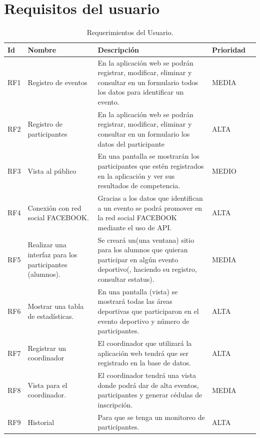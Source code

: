 	\section{Requisitos del usuario}
	\begin{table}[htbp]
		\begin{center}
			\begin{tabular}{|l|p{45mm}|p{45mm}|p{45mm}|l}
				\hline
				Id & Nombre & Descripción & Prioridad \\
				\hline 
				RF1 & Registro de eventos & En la aplicación web se podrán registrar, modificar, eliminar y consultar  en un formulario todos los datos para identificar un evento.
				& MEDIA \\ \hline
				RF2 & Registro de participantes & En la aplicación web se podrán registrar, modificar, eliminar y consultar  en un formulario los datos del participante & ALTA  \\ \hline
				RF3 & Vista al público & En una pantalla se mostrarán los participantes que estén registrados en la aplicación y ver sus resultados de competencia. & MEDIO \\ \hline
				RF4 & Conexión con red social FACEBOOK. & Gracias a los datos que identifican a un evento se podrá promover en la red social FACEBOOK mediante el uso de API.& ALTA \\ \hline
				RF5 & Realizar una interfaz para los participantes (alumnos). &Se creará un(una ventana)  sitio para los alumnos que quieran participar en algún evento deportivo(, haciendo su registro, consultar estatus). & MEDIA \\ \hline
				RF6 & Mostrar una tabla de estadísticas. & En una pantalla (vista)  se mostrará todas las áreas deportivas que participaron en el evento deportivo y  número de participantes. & ALTA \\ \hline
				RF7 & Registrar un coordinador & El coordinador que utilizará la aplicación web tendrá que ser registrado en la base de datos. & ALTA \\ \hline
				RF8 & Vista para el coordinador. &El coordinador tendrá una vista donde podrá dar de alta eventos, participantes y generar cédulas de inscripción. & MEDIA \\ \hline
				RF9  & Historial & Para que se tenga un monitoreo de participantes. & ALTA \\ \hline
			\end{tabular}
			\caption{Requerimientos del Usuario.}
			\label{tabla:sencilla}
		\end{center}
	\end{table}
	\pagebreak
	
